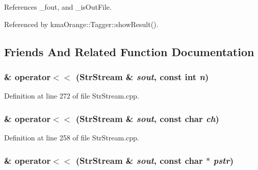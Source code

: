 References \_\-fout, and \_\-isOutFile.

Referenced by kmaOrange::Tagger::showResult().

\subsection{Friends And Related Function Documentation}
\hypertarget{classkmaOrange_1_1StrStream_3dc307219c9aa34369ba14448e84f855}{
\subsubsection[{operator$<$$<$}]{\& operator$<$$<$ ({\bf StrStream} \& {\em sout}, \/  const int {\em n})}}
\label{classkmaOrange_1_1StrStream_3dc307219c9aa34369ba14448e84f855}




Definition at line 272 of file StrStream.cpp.\hypertarget{classkmaOrange_1_1StrStream_c6389cf6b3e7bf3dd2b00fd219351eb4}{
\subsubsection[{operator$<$$<$}]{\& operator$<$$<$ ({\bf StrStream} \& {\em sout}, \/  const char {\em ch})}}
\label{classkmaOrange_1_1StrStream_c6389cf6b3e7bf3dd2b00fd219351eb4}




Definition at line 258 of file StrStream.cpp.\hypertarget{classkmaOrange_1_1StrStream_b601ecae9d38437878116f4d2f1a70c9}{
\subsubsection[{operator$<$$<$}]{\& operator$<$$<$ ({\bf StrStream} \& {\em sout}, \/  const char $\ast$ {\em pstr})}}
\label{classkmaOrange_1_1StrStream_b601ecae9d38437878116f4d2f1a70c9}




